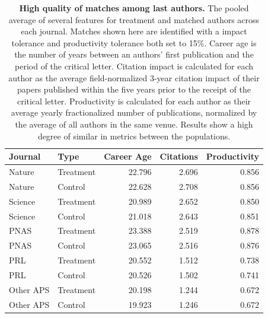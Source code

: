 \documentclass[12pt]{article} %
\begin{document}
\clearpage
\begin{table}[p]
\centering
\caption{
\textbf{High quality of matches among last authors.}
The pooled average of several features for treatment and matched authors across each journal. 
Matches shown here are identified with a impact tolerance and productivity tolerance both set to 15\%.
Career age is the number of years between an authors' first publication and the period of the critical letter. 
Citation impact is calculated for each author as the average field-normalized 3-year citation impact of their papers published within the five years prior to the receipt of the critical letter.
Productivity is calculated for each author as their average yearly fractionalized number of publications, normalized by the average of all authors in the same venue.
Results show a high degree of similar in metrics between the populations.
}
\label{si:tab:last-author-match-quality}
\begin{tabular}{llrrr}
  \toprule
Journal & Type & Career Age & Citations & Productivity \\ 
  \midrule
Nature & Treatment & 22.796 & 2.696 & 0.856 \\ 
  Nature & Control & 22.628 & 2.708 & 0.856 \\ 
  Science & Treatment & 20.989 & 2.652 & 0.850 \\ 
  Science & Control & 21.018 & 2.643 & 0.851 \\ 
  PNAS & Treatment & 23.388 & 2.519 & 0.878 \\ 
  PNAS & Control & 23.065 & 2.516 & 0.876 \\ 
  PRL & Treatment & 20.552 & 1.512 & 0.738 \\ 
  PRL & Control & 20.526 & 1.502 & 0.741 \\ 
  Other APS & Treatment & 20.198 & 1.244 & 0.672 \\ 
  Other APS & Control & 19.923 & 1.246 & 0.672 \\ 
   \bottomrule
\end{tabular}
\end{table}
\end{document}
